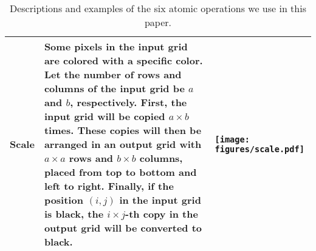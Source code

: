 \begin{table*}[tb]
\begin{tabular}{p{2cm}p{7cm}p{5cm}}
   \midrule[0.5pt]
   \textbf{Scale} & Some pixels in the input grid are colored with a specific color. Let the number of rows and columns of the input grid be \(a\) and \(b\), respectively. First, the input grid will be copied \(a \times b\) times. These copies will then be arranged in an output grid with \(a \times a\) rows and \(b \times b\) columns, placed from top to bottom and left to right. Finally, if the position \((i, j)\) in the input grid is black, the \(i \times j\)-th copy in the output grid will be converted to black. & \vspace{-4.5mm} \begin{center}\texttt{[image: figures/scale.pdf]}\end{center} \vspace{-6mm} \\
    \bottomrule[1pt]
  \end{tabular}
  \caption{Descriptions and examples of the six atomic operations we use in this paper.}
  \vspace{-0.1in}
  \label{tab:atom operations}
\end{table*}


